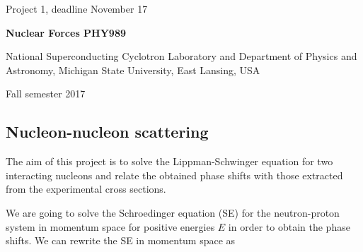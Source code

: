 \documentclass[%
oneside,                 %
final,                   %
10pt]{article}
\begin{document}

\newcommand{\exercisesection}[1]{\subsection*{#1}}






\thispagestyle{empty}

\begin{center}
{\LARGE\bf
\begin{spacing}{1.25}
Project 1, deadline  November 17
\end{spacing}
}
\end{center}


\begin{center}
{\bf Nuclear Forces PHY989}
\end{center}

    \begin{center}
\centerline{{\small National Superconducting Cyclotron Laboratory and Department of Physics and Astronomy, Michigan State University, East Lansing, USA}}
\end{center}
    

\begin{center}
Fall semester 2017
\end{center}

\vspace{1cm}


\subsection*{Nucleon-nucleon scattering}

The aim of this project is to solve the Lippman-Schwinger equation for two interacting nucleons and relate the obtained phase shifts with those extracted from the experimental cross sections.

We are going to solve the Schroedinger equation (SE) 
for the neutron-proton system 
in momentum space for positive energies $E$ in order to obtain
the phase shifts. 
We can rewrite the SE 
in momentum space as
\end{document}
